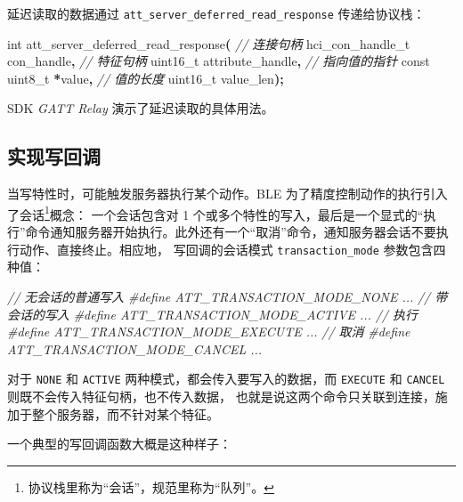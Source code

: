 \documentclass[
  12pt,
]{book}
\newenvironment{Shaded}{\begin{snugshade}}{\end{snugshade}}
\newcommand{\CommentTok}[1]{\textcolor[rgb]{0.56,0.35,0.01}{\textit{#1}}}
\newcommand{\DataTypeTok}[1]{\textcolor[rgb]{0.13,0.29,0.53}{#1}}
\newcommand{\NormalTok}[1]{#1}
\newcommand{\OperatorTok}[1]{\textcolor[rgb]{0.81,0.36,0.00}{\textbf{#1}}}
\newcommand{\PreprocessorTok}[1]{\textcolor[rgb]{0.56,0.35,0.01}{\textit{#1}}}
\begin{document}
延迟读取的数据通过 \texttt{att\_server\_deferred\_read\_response} 传递给协议栈：

\begin{Shaded}
\begin{Highlighting}[]
\DataTypeTok{int}\NormalTok{ att\_server\_deferred\_read\_response}\OperatorTok{(}
  \CommentTok{// 连接句柄}
\NormalTok{  hci\_con\_handle\_t con\_handle}\OperatorTok{,}
  \CommentTok{// 特征句柄}
  \DataTypeTok{uint16\_t}\NormalTok{ attribute\_handle}\OperatorTok{,}
  \CommentTok{// 指向值的指针}
  \DataTypeTok{const} \DataTypeTok{uint8\_t} \OperatorTok{*}\NormalTok{value}\OperatorTok{,}
  \CommentTok{// 值的长度}
  \DataTypeTok{uint16\_t}\NormalTok{ value\_len}\OperatorTok{);}
\end{Highlighting}
\end{Shaded}

SDK \emph{GATT Relay} 演示了延迟读取的具体用法。

\hypertarget{ux5b9eux73b0ux5199ux56deux8c03}{%
\subsection{实现写回调}\label{ux5b9eux73b0ux5199ux56deux8c03}}

当写特性时，可能触发服务器执行某个动作。BLE 为了精度控制动作的执行引入了会话\footnote{协议栈里称为``会话''，规范里称为``队列''。}概念：
一个会话包含对 1 个或多个特性的写入，最后是一个显式的``执行''命令通知服务器开始执行。此外还有一个``取消''命令，通知服务器会话不要执行动作、直接终止。相应地，
写回调的会话模式 \texttt{transaction\_mode} 参数包含四种值：

\begin{Shaded}
\begin{Highlighting}[]
\CommentTok{// 无会话的普通写入}
\PreprocessorTok{\#define ATT\_TRANSACTION\_MODE\_NONE      ...}
\CommentTok{// 带会话的写入}
\PreprocessorTok{\#define ATT\_TRANSACTION\_MODE\_ACTIVE    ...}
\CommentTok{// 执行}
\PreprocessorTok{\#define ATT\_TRANSACTION\_MODE\_EXECUTE   ...}
\CommentTok{// 取消}
\PreprocessorTok{\#define ATT\_TRANSACTION\_MODE\_CANCEL    ...}
\end{Highlighting}
\end{Shaded}

对于 \texttt{NONE} 和 \texttt{ACTIVE} 两种模式，都会传入要写入的数据，而 \texttt{EXECUTE} 和 \texttt{CANCEL} 则既不会传入特征句柄，也不传入数据，
也就是说这两个命令只关联到连接，施加于整个服务器，而不针对某个特征。

一个典型的写回调函数大概是这种样子：
\end{document}
